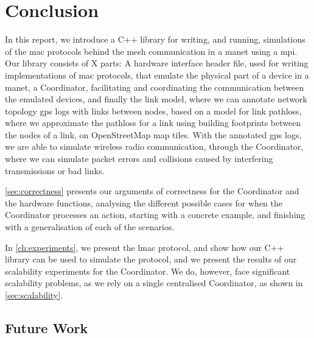 \chapter{Conclusion}\label{ch:conclusion}
In this report, we introduce a C++ library for writing, and running, simulations of the \gls{mac} protocols
behind the mesh communication in a \gls{manet} using a \gls{mpi}. Our library consists of X parts: A hardware
interface header file, used for writing implementations of \gls{mac} protocols, that emulate the physical part
of a device in a \gls{manet}, a Coordinator, facilitating and coordinating the communication between the
emulated devices, and finally the link model, where we can annotate network topology \gls{gps} logs with links
between nodes, based on a model for link \gls{pathloss}, where we approximate the \gls{pathloss} for a link
using building footprints between the nodes of a link, on OpenStreetMap map tiles. With the annotated
\gls{gps} logs, we are able to simulate wireless radio communication, through the Coordinator, where we can
simulate packet errors and collisions caused by interfering transmissions or bad links. \smallbreak


\autoref{sec:correctness} presents our arguments of correctness for the Coordinator and the hardware
functions, analysing the different possible cases for when the Coordinator processes an action, starting with 
a concrete example, and finishing with a generalisation of each of the scenarios. \smallbreak

In \autoref{ch:experiments}, we present the \gls{lmac} protocol, and show how our C++ library can be used to
simulate the protocol, and we present the results of our scalability experiments for the Coordinator. We do,
however, face significant scalability problems, as we rely on a single centralised Coordinator, as shown in
\autoref{sec:scalability}.


\section{Future Work}

